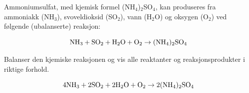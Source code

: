 
Ammoniumsulfat, med kjemisk formel (NH$_{4}$)$_{2}$SO$_{4}$, kan produseres fra ammoniakk (NH$_{3}$), svoveldioksid (SO$_{2}$), vann (H$_{2}$O) og oksygen (O$_{2}$) ved følgende (ubalanserte) reaksjon:

$$\hbox{NH}_3 + \hbox{SO}_2 + \hbox{H}_2\hbox{O} + \hbox{O}_2 \to (\hbox{NH}_4)_2\hbox{SO}_4$$

Balanser den kjemiske reaksjonen og vis alle reaktanter og reaksjonsprodukter i riktige forhold.







$$4\hbox{NH}_3 + 2\hbox{SO}_2 + 2\hbox{H}_2\hbox{O} + \hbox{O}_2 \to 2(\hbox{NH}_4)_2\hbox{SO}_4$$









